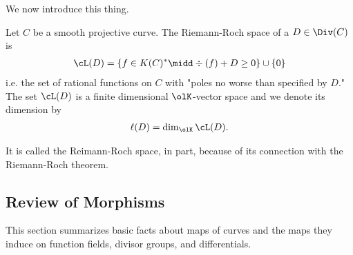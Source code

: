 We now introduce this thing.
\begin{defn}\label{defn:reim-roch-space}
	Let $C$ be a smooth projective curve. The Riemann-Roch space of a $D \in \Div(C)$ is
	\begin{align*}
		\cL(D) = \left\{f \in K(C)^* \midd \div(f) + D \geq 0\right\} \cup \left\{0\right\}
	\end{align*}
	i.e. the set of rational functions on $C$ with "poles no worse than specified by $D$." The set $\cL(D)$ is a finite dimensional $\olK$-vector space and we denote its dimension by 
	\begin{align*}
		\ell(D) = \dim_{\olK}\cL(D).
	\end{align*}
\end{defn}
It is called the Reimann-Roch space, in part, because of its connection with the Riemann-Roch theorem.


\subsection{Review of Morphisms}
	This section summarizes basic facts about maps of curves and the maps they induce on function fields, divisor groups, and differentials.
	
	\bigskip

